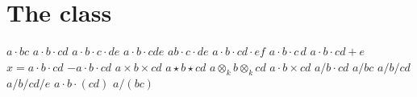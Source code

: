 \documentclass{article}
\begin{document}
\section{The class}
$a\cdot b c$ $a\cdot b\cdot c d$ $a\cdot b\cdot c\cdot d e$ $a\cdot b\cdot c d e$ $a b\cdot c\cdot d e$
$a\cdot b\cdot c d\cdot e f$ $a\cdot b\cdot c\,d$ $a\cdot b\cdot c d+e$ $x=a\cdot b\cdot c d$ $-a\cdot b\cdot c d$
$a\times b\times c d$ $a\star b\star c d$ $a\otimes_k b\otimes_k c d$ $a\cdot b\times c d$ $a/b\cdot c d$
$a/b c$ $a/b/c d$ $a/b/c d/e$ $a\cdot b\cdot(c d)$ $a/(b c)$

\end{document}
